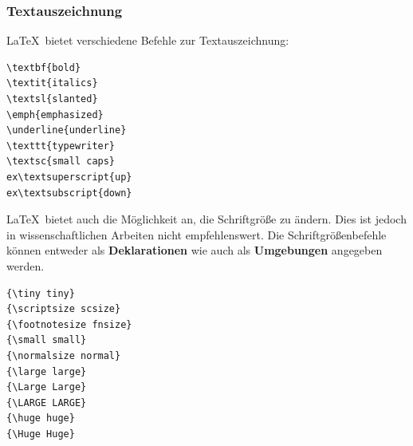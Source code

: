 \begin{frame}[fragile]
\frametitle{Textauszeichnung}

\LaTeX\ bietet verschiedene Befehle zur Textauszeichnung:

\begin{multicols}{2}

\begin{lstlisting}
\textbf{bold} 
\textit{italics}
\textsl{slanted} 
\emph{emphasized} 
\underline{underline} 
\texttt{typewriter} 
\textsc{small caps} 
ex\textsuperscript{up} 
ex\textsubscript{down} 
\end{lstlisting}


\end{multicols}
\end{frame}


\begin{frame}[fragile]

\LaTeX\ bietet auch die Möglichkeit an, die Schriftgröße zu ändern. Dies ist jedoch in wissenschaftlichen Arbeiten nicht empfehlenswert. Die Schriftgrößenbefehle können entweder als \textbf{Deklarationen} wie auch als \textbf{Umgebungen} angegeben werden.

\begin{multicols}{2}
\begin{lstlisting}
{\tiny tiny} 
{\scriptsize scsize} 
{\footnotesize fnsize} 
{\small small} 
{\normalsize normal} 
{\large large} 
{\Large Large} 
{\LARGE LARGE} 
{\huge huge} 
{\Huge Huge} 
\end{lstlisting} 
\columnbreak{}
\end{multicols}

\end{frame}


